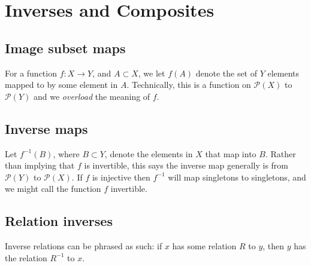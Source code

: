 \documentclass{article}
\newcommand{\pow}[1]{\mathscr{P}(#1)}
\begin{document}
\section{Inverses and Composites}

\subsection{Image subset maps}

For a function $f: X \longrightarrow Y$, and $A \subset X$, we let $f(A)$ denote the set of $Y$ elements mapped to by some element in $A$. Technically, this is a function on $\pow{X}$ to $\mathscr{P}(Y)$ and we \textit{overload} the meaning of $f$. 

\subsection{Inverse maps}

Let $f^{-1}(B)$, where $B \subset Y$, denote the elements in $X$ that map into $B$. Rather than implying that $f$ is invertible, this says the inverse map generally is from $\pow{Y}$ to $\pow{X}$. If $f$ is injective then $f^{-1}$ will map singletons to singletons, and we might call the function $f$ invertible.

\subsection{Relation inverses}

Inverse relations can be phrased as such: if $x$ has some relation $R$ to $y$, then $y$ has the relation $R^{-1} $ to $x$.
\end{document}
